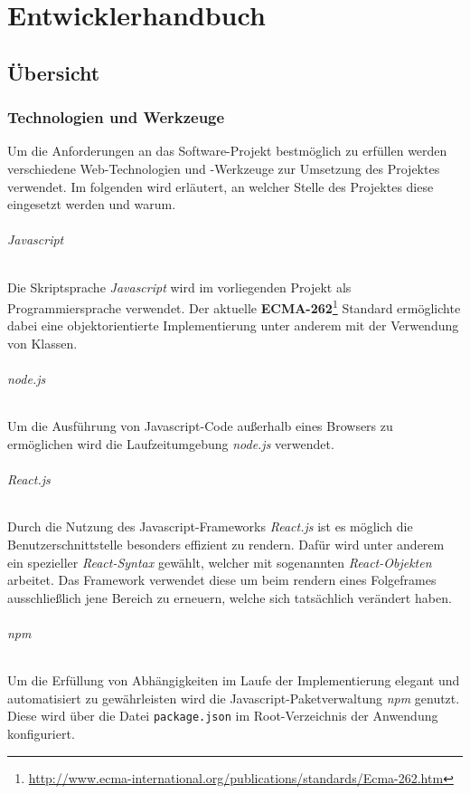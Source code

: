 \part{Entwicklerhandbuch}

\chapter{Übersicht}
\section{Technologien und Werkzeuge}
Um die Anforderungen an das Software-Projekt bestmöglich zu erfüllen werden verschiedene Web-Technologien und -Werkzeuge zur Umsetzung des Projektes verwendet. Im folgenden wird erläutert, an welcher Stelle des Projektes diese eingesetzt werden und warum.

\paragraph{Javascript}Die Skriptsprache \textit{Javascript} wird im vorliegenden Projekt als Programmiersprache verwendet. Der aktuelle \textbf{ECMA-262}\footnote{\url{http://www.ecma-international.org/publications/standards/Ecma-262.htm}} Standard ermöglichte dabei eine objektorientierte Implementierung unter anderem mit der Verwendung von Klassen.

\paragraph{node.js}Um die Ausführung von Javascript-Code außerhalb eines Browsers zu ermöglichen wird die Laufzeitumgebung \textit{node.js} verwendet.

\paragraph{React.js}Durch die Nutzung des Javascript-Frameworks \textit{React.js} ist es möglich die Benutzerschnittstelle besonders effizient zu rendern. Dafür wird unter anderem ein spezieller \textit{React-Syntax} gewählt, welcher mit sogenannten \textit{React-Objekten} arbeitet. Das Framework verwendet diese um beim rendern eines Folgeframes ausschließlich jene Bereich zu erneuern, welche sich tatsächlich verändert haben.

\paragraph{npm}Um die Erfüllung von Abhängigkeiten im Laufe der Implementierung elegant und automatisiert zu gewährleisten wird die Javascript-Paketverwaltung \textit{npm} genutzt. Diese wird über die Datei \texttt{package.json} im Root-Verzeichnis der Anwendung konfiguriert.

